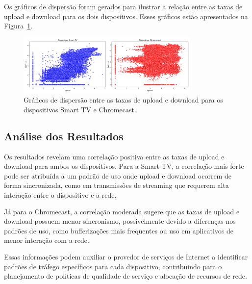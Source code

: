 Os gráficos de dispersão foram gerados para ilustrar a relação entre as taxas de upload e download para os dois dispositivos. Esses gráficos estão apresentados na Figura~\ref{fig:scatter_plot}.

\begin{figure}[H]
    \centering
    \includegraphics[width=0.8\textwidth]{../correlação/scatter_plot.png}
    \caption{Gráficos de dispersão entre as taxas de upload e download para os dispositivos Smart TV e Chromecast.}
    \label{fig:scatter_plot}
\end{figure}

\subsection{Análise dos Resultados}

Os resultados revelam uma correlação positiva entre as taxas de upload e download para ambos os dispositivos. Para a Smart TV, a correlação mais forte pode ser atribuída a um padrão de uso onde upload e download ocorrem de forma sincronizada, como em transmissões de streaming que requerem alta interação entre o dispositivo e a rede.

Já para o Chromecast, a correlação moderada sugere que as taxas de upload e download possuem menor sincronismo, possivelmente devido a diferenças nos padrões de uso, como bufferizações mais frequentes ou uso em aplicativos de menor interação com a rede.

Essas informações podem auxiliar o provedor de serviços de Internet a identificar padrões de tráfego específicos para cada dispositivo, contribuindo para o planejamento de políticas de qualidade de serviço e alocação de recursos de rede.
